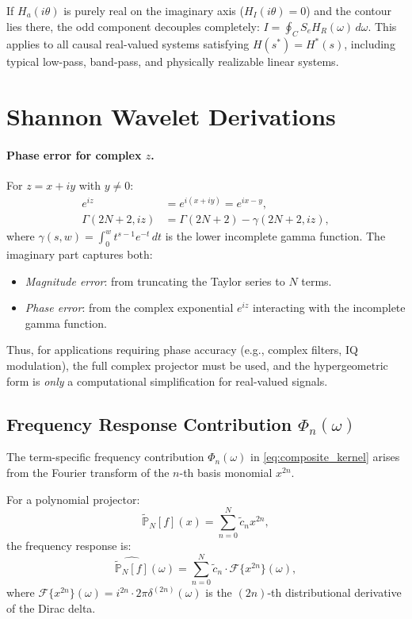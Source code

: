 If $H_a(i\theta)$ is purely real on the imaginary axis ($H_I(i\theta) = 0$) and the contour lies there, the odd component decouples completely: $I = \oint_C S_e H_R(\omega) \, d\omega$. This applies to all causal real-valued systems satisfying $H(s^*) = H^*(s)$, including typical low-pass, band-pass, and physically realizable linear systems.


\section{Shannon Wavelet Derivations}\label{app:shannon-wavelets}

\paragraph{Phase error for complex $z$.} For $z = x + iy$ with $y \neq 0$:
\begin{align*}
e^{iz} &= e^{i(x+iy)} = e^{ix - y}, \\
\Gamma(2N+2, iz) &= \Gamma(2N+2) - \gamma(2N+2, iz),
\end{align*}
where $\gamma(s, w) = \int_0^w t^{s-1} e^{-t} \, dt$ is the lower incomplete gamma function. The imaginary part captures both:
\begin{itemize}
\item \emph{Magnitude error}: from truncating the Taylor series to $N$ terms.
\item \emph{Phase error}: from the complex exponential $e^{iz}$ interacting with the incomplete gamma function.
\end{itemize}

Thus, for applications requiring phase accuracy (e.g., complex filters, IQ modulation), the full complex projector must be used, and the hypergeometric form is \emph{only} a computational simplification for real-valued signals.

\subsection{Frequency Response Contribution $\Phi_n(\omega)$}

The term-specific frequency contribution $\Phi_n(\omega)$ in \eqref{eq:composite_kernel} arises from the Fourier transform of the $n$-th basis monomial $x^{2n}$.

For a polynomial projector:
\[
\widetilde{\mathbb{P}}_N[f](x) = \sum_{n=0}^{N} \widetilde{c}_n x^{2n},
\]
the frequency response is:
\[
\widehat{\widetilde{\mathbb{P}}_N[f]}(\omega) = \sum_{n=0}^{N} \widetilde{c}_n \cdot \mathcal{F}\{x^{2n}\}(\omega),
\]
where $\mathcal{F}\{x^{2n}\}(\omega) = i^{2n} \cdot 2\pi \delta^{(2n)}(\omega)$ is the $(2n)$-th distributional derivative of the Dirac delta.

